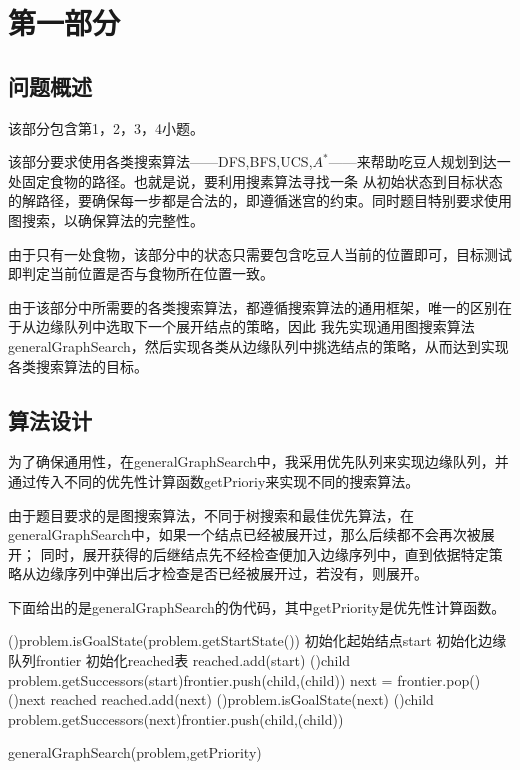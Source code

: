 \chapter{第一部分}
\section{问题概述}
%
%
该部分包含第1，2，3，4小题。

该部分要求使用各类搜索算法——DFS,BFS,UCS,$A^*$——来帮助吃豆人规划到达一处固定食物的路径。也就是说，要利用搜素算法寻找一条
从初始状态到目标状态的解路径，要确保每一步都是合法的，即遵循迷宫的约束。同时题目特别要求使用图搜索，以确保算法的完整性。

由于只有一处食物，该部分中的状态只需要包含吃豆人当前的位置即可，目标测试即判定当前位置是否与食物所在位置一致。

由于该部分中所需要的各类搜索算法，都遵循搜索算法的通用框架，唯一的区别在于从边缘队列中选取下一个展开结点的策略，因此
我先实现通用图搜索算法generalGraphSearch，然后实现各类从边缘队列中挑选结点的策略，从而达到实现各类搜索算法的目标。
%
%

%
%

\section{算法设计}
为了确保通用性，在generalGraphSearch中，我采用优先队列来实现边缘队列，并通过传入不同的优先性计算函数getPrioriy来实现不同的搜索算法。

由于题目要求的是图搜索算法，不同于树搜索和最佳优先算法，在generalGraphSearch中，如果一个结点已经被展开过，那么后续都不会再次被展开；
同时，展开获得的后继结点先不经检查便加入边缘序列中，直到依据特定策略从边缘序列中弹出后才检查是否已经被展开过，若没有，则展开。

下面给出的是generalGraphSearch的伪代码，其中getPriority是优先性计算函数。

\begin{procedure}[H]
    \lIf(){problem.isGoalState(problem.getStartState())}{\KwRet{\emptyActions}}
    初始化起始结点start\;
    初始化边缘队列frontier\;
    初始化reached表\;
    reached.add(start)\;
    \lForEach(){child \in problem.getSuccessors(start)}{frontier.push(child,\getPriority(child))}
    {
        next = frontier.pop()\;
        \lIf(){next \in reached}{\continue}
        reached.add(next)\;
        \lIf(){problem.isGoalState(next)}{}
        \lForEach(){child \in problem.getSuccessors(next)}{frontier.push(child,\getPriority(child))}
    }
    \caption{generalGraphSearch(problem,getPriority)}
\end{procedure}

